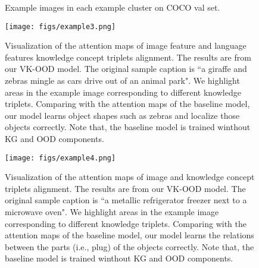 \documentclass{article}
\begin{document}
\begin{figure}
\centering


\caption{Example images in each example cluster on COCO val set.}\label{fig:cl}
\end{figure}


\begin{figure}
\texttt{[image: figs/example3.png]}

\centering
\caption{Visualization of the attention maps of image feature  and language features  knowledge concept triplets alignment. The results are from our VK-OOD model. The original sample caption is ``a giraffe and zebras mingle as cars drive out of an animal park".  We highlight areas in the example image corresponding to different knowledge triplets. Comparing with the attention maps of the baseline model, our model learns object shapes such as zebras and localize those objects correctly. Note that, the baseline model is trained winthout KG and OOD components.\label{fig:example3}}
\end{figure}

\begin{figure}
\texttt{[image: figs/example4.png]}

\centering
\caption{Visualization of the attention maps of image and knowledge concept triplets alignment. The results are from our VK-OOD model. The original sample caption is ``a metallic refrigerator freezer next to a microwave oven". We highlight areas in the example image corresponding to different knowledge triplets. Comparing with the attention maps of the baseline model, our model learns the relations between the parts (i.e., plug) of the objects correctly. Note that, the baseline model is trained winthout KG and OOD components.\label{fig:example4}}
\end{figure}
\end{document}
